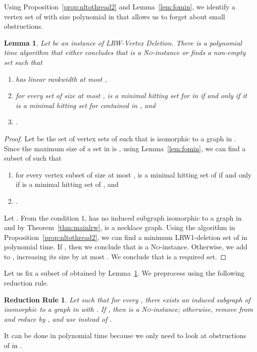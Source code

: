 \documentclass[11pt]{article}
\newtheorem{lemma}[theorem]{Lemma}
\newtheorem{RULE}{Reduction Rule}
\theoremstyle{remark}
\newcommand{\NO}{\textsc{No}}
\begin{document}
Using Proposition~\ref{prop:nltothread2} and Lemma~\ref{lem:fomin}, we identify a vertex set  of  with size polynomial in  that allows us to forget about small obstructions. 

\begin{lemma}\label{lem:shrink}
Let  be an instance of {\sc LRW-Vertex Deletion}. There is a polynomial time algorithm that either concludes that  is a \NO-instance or finds a non-empty set  such that
\begin{enumerate}
\item  has linear rankwidth at most ,
\item for every set  of size at most ,  is a minimal hitting set for  in  if and only if it is a minimal hitting set for  contained in , and
\item .
\end{enumerate}
\end{lemma}

\begin{proof}
Let  be the set of vertex sets  of  such that  is isomorphic to a graph in . 
Since the maximum size of a set in  is , 
using Lemma~\ref{lem:fomin}, we can find a subset  of  such that
\begin{enumerate}
\item   for every vertex subset  of size at most , 
	 is a minimal hitting set of  if and only if  is a minimal hitting set of , and
\item  .
\end{enumerate}

Let . 
From the condition 1,
 has no induced subgraph isomorphic to a graph in  and by Theorem~\ref{thm:mainlrw},  is a necklace graph.
Using the algorithm in Proposition~\ref{prop:nltothread2}, we can find a minimum LRW1-deletion set  of  in polynomial time.
If , then we conclude that  is a \NO-instance.
Otherwise, we add  to , increasing its size by at most .
We conclude that  is a required set.
\end{proof}

Let us fix a subset  of  obtained by Lemma~\ref{lem:shrink}.  
We preprocess using the following reduction rule.

\begin{RULE}\label{rule:onevertex}
Let  such that for every , there exists an induced subgraph  of  isomorphic to a graph in  with .
If , then  is a \NO-instance; otherwise, remove  from  and reduce  by , and use  instead of .
\end{RULE}
It can be done in polynomial time because we only need to look at obstructions of  in . 
\end{document}
